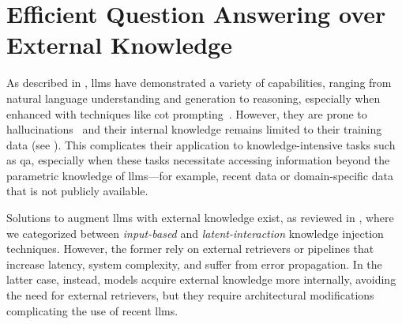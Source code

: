 \chapter[Efficient Question Answering over External Knowledge][Efficient \acs{qa} over External Knowledge]{Efficient Question Answering over External Knowledge}
\label{chap:refactx}


As described in , \acfp{llm} have demonstrated a variety of capabilities, ranging from natural language understanding and generation to reasoning, especially when enhanced with techniques like \acf{cot} prompting~\cite{wei2022chainofthought}. However, they are prone to hallucinations~\cite{maynez-etal-2020-faithfulness-hallucination} and their internal knowledge remains limited to their training data (see ). This complicates their application to knowledge-intensive tasks such as \acf{qa}, especially when these tasks necessitate accessing information beyond the parametric knowledge of \acp{llm}---for example, recent data or domain-specific data that is not publicly available.


Solutions to augment \acp{llm} with external knowledge exist, as reviewed in , where we categorized between \emph{input-based} and \emph{latent-interaction} knowledge injection techniques. However, the former rely on external retrievers or pipelines that increase latency, system complexity, and suffer from error propagation.
In the latter case, instead, models acquire external knowledge more internally, avoiding the need for external retrievers, but they require architectural modifications complicating the use of recent \acp{llm}. 



